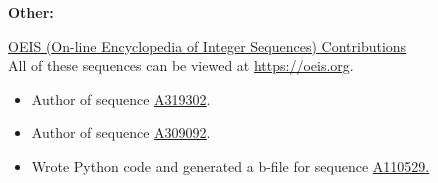 \textbf{Other:}

\ul{OEIS (On-line Encyclopedia of Integer Sequences) Contributions} \\
\indent All of these sequences can be viewed at \url{https://oeis.org}.
\begin{itemize}[noitemsep]
\item Author of sequence \href{https://oeis.org/A319302}{\ul{A319302}}.
\item Author of sequence \href{https://oeis.org/A309092}{\ul{A309092}}.
\item Wrote Python code and generated a b-file for sequence \href{https://oeis.org/A110529}{\ul{A110529}.}
\end{itemize}
